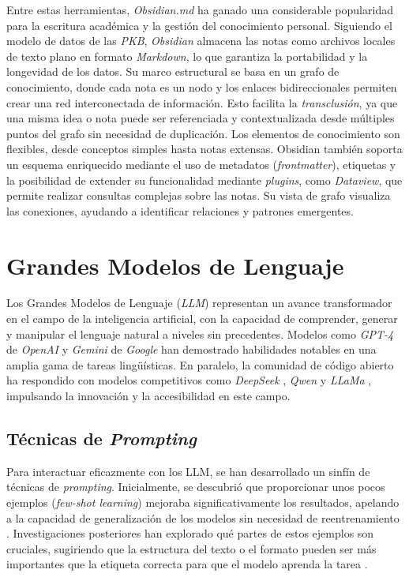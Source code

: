 Entre estas herramientas, \textit{Obsidian.md} ha ganado una considerable popularidad para la escritura académica y la gestión del conocimiento personal. Siguiendo el modelo de datos de las \textit{PKB}, \textit{Obsidian} almacena las notas como archivos locales de texto plano en formato \textit{Markdown}, lo que garantiza la portabilidad y la longevidad de los datos. Su marco estructural se basa en un grafo de conocimiento, donde cada nota es un nodo y los enlaces bidireccionales permiten crear una red interconectada de información. Esto facilita la \textit{transclusión}, ya que una misma idea o nota puede ser referenciada y contextualizada desde múltiples puntos del grafo sin necesidad de duplicación. Los elementos de conocimiento son flexibles, desde conceptos simples hasta notas extensas. Obsidian también soporta un esquema enriquecido mediante el uso de metadatos (\textit{frontmatter}), etiquetas y la posibilidad de extender su funcionalidad mediante \textit{plugins}, como \textit{Dataview}, que permite realizar consultas complejas sobre las notas. Su vista de grafo visualiza las conexiones, ayudando a identificar relaciones y patrones emergentes.

\section{Grandes Modelos de Lenguaje}
\label{sec:llm}
Los Grandes Modelos de Lenguaje (\textit{LLM}) representan un avance transformador en el campo de la inteligencia artificial, con la capacidad de comprender, generar y manipular el lenguaje natural a niveles sin precedentes. Modelos como \textit{GPT-4} de \textit{OpenAI} \parencite{openaiGPT4TechnicalReport2024} y \textit{Gemini} de \textit{Google} \parencite{teamGeminiFamilyHighly2024} han demostrado habilidades notables en una amplia gama de tareas lingüísticas. En paralelo, la comunidad de código abierto ha respondido con modelos competitivos como \textit{DeepSeek} \parencite{deepseek-aiDeepSeekV3TechnicalReport2024}, \textit{Qwen} \parencite{baiQwenTechnicalReport2023} y \textit{LLaMa} \parencite{grattafioriLlama3Herd2024}, impulsando la innovación y la accesibilidad en este campo.

\subsection{Técnicas de \textit{Prompting}}
\label{subsec:prompting_techniques}
Para interactuar eficazmente con los LLM, se han desarrollado un sinfín de técnicas de \textit{prompting}. Inicialmente, se descubrió que proporcionar unos pocos ejemplos (\textit{few-shot learning}) mejoraba significativamente los resultados, apelando a la capacidad de generalización de los modelos sin necesidad de reentrenamiento \parencite{brownLanguageModelsAre2020}. Investigaciones posteriores han explorado qué partes de estos ejemplos son cruciales, sugiriendo que la estructura del texto o el formato pueden ser más importantes que la etiqueta correcta para que el modelo aprenda la tarea \parencite{minRethinkingRoleDemonstrations2022}.

